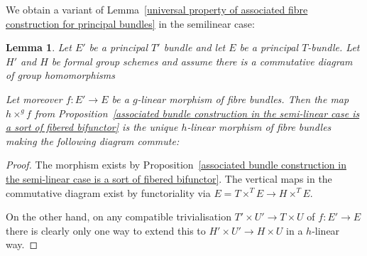 \documentclass[11pt,oneside]{amsart}
\newtheorem{lemma}[theorem]{Lemma}
\theoremstyle{definition}
\theoremstyle{remark}
\begin{document}
	We obtain a variant of Lemma~\ref{universal property of associated fibre construction for principal bundles} in the semilinear case:
	
	\begin{lemma}\label{universal property of associated fibre construction in the semilinear case}
		Let $E'$ be a principal $T'$ bundle and let $E$ be a principal $T$-bundle. Let $H'$ and $H$ be formal group schemes and assume there is a commutative diagram of group homomorphisms
		\begin{center}
		\end{center}
		Let moreover $f:E'\rightarrow E$ be a $g$-linear morphism of fibre bundles.
		Then the map $h\times^g f$ from Proposition~\ref{associated bundle construction in the semi-linear case is a sort of fibered bifunctor} is the unique $h$-linear morphism of fibre bundles making the following diagram commute:
		\begin{center}
		\end{center}
	\end{lemma}
	\begin{proof}
		The morphism exists by Proposition~\ref{associated bundle construction in the semi-linear case is a sort of fibered bifunctor}. The vertical maps in the commutative diagram exist by functoriality via $E=T\times^{T}E\rightarrow H\times^{T}E$. 
		
		On the other hand, on any compatible trivialisation $T'\times U'\rightarrow T\times U$ of $f:E'\rightarrow E$ there is clearly only one way to extend this to $H'\times U'\rightarrow H\times U$ in a $h$-linear way.
	\end{proof}
	
\end{document}
